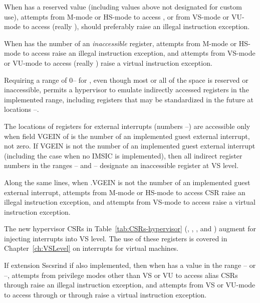 When  has a reserved value (including values above
 not designated for custom use), attempts from \mbox{M-mode}
or \mbox{HS-mode} to access , or from \mbox{VS-mode}
or \mbox{VU-mode} to access  (really ),
should preferably raise an illegal instruction exception.

When  has the number of an \emph{inaccessible} register,
attempts from \mbox{M-mode} or \mbox{HS-mode} to access 
raise an illegal instruction exception, and attempts from
\mbox{VS-mode} or \mbox{VU-mode} to access 
(really ) raise a virtual instruction exception.

\begin{commentary}
Requiring a range of\/ {\rm 0}-- for , even
though most or all of the space is
reserved or inaccessible, permits a hypervisor
to emulate indirectly accessed registers in the implemented range,
including registers that may be standardized in the future at locations
--.
\end{commentary}

The locations of registers for external interrupts (numbers
--) are accessible only when field VGEIN of 
is the number of an implemented guest external interrupt, not zero.
If VGEIN is not the number of an implemented guest external interrupt
(including the case when no IMSIC is implemented), then all
indirect register numbers in the ranges -- and
-- designate an inaccessible register at VS level.

Along the same lines, when .VGEIN is not the number of
an implemented guest external interrupt, attempts from \mbox{M-mode}
or \mbox{HS-mode} to access CSR 
raise an illegal instruction exception,
and attempts from \mbox{VS-mode} to access  raise a
virtual instruction exception.

The new hypervisor CSRs in Table~\ref{tab:CSRs-hypervisor}
(, , , and )
augment  for injecting interrupts into VS level.
The use of these registers is covered in Chapter~\ref{ch:VSLevel} on
interrupts for virtual machines.

If extension Sscsrind if also implemented, then when  has
a value in the range -- or --,
attempts from privilege modes other than VS or VU to access alias CSRs
 through  raise an illegal instruction exception,
and attempts from VS or \mbox{VU-mode} to access 
through  or  through 
raise a virtual instruction exception.

